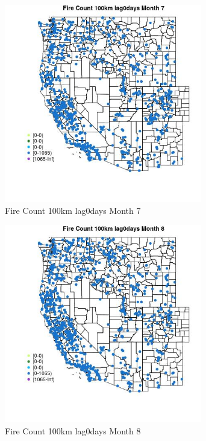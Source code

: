 \begin{figure} 
\centering  
\includegraphics[width=0.77\textwidth]{Code_Outputs/Report_ML_input_PM25_Step4_part_f_de_duplicated_aves_prioritize_24hr_obswNAs_MapObsMo7Fire_Count_100km_lag0days.jpg} 
\caption{\label{fig:Report_ML_input_PM25_Step4_part_f_de_duplicated_aves_prioritize_24hr_obswNAsMapObsMo7Fire_Count_100km_lag0days}Fire Count 100km lag0days Month 7} 
\end{figure} 
 

\begin{figure} 
\centering  
\includegraphics[width=0.77\textwidth]{Code_Outputs/Report_ML_input_PM25_Step4_part_f_de_duplicated_aves_prioritize_24hr_obswNAs_MapObsMo8Fire_Count_100km_lag0days.jpg} 
\caption{\label{fig:Report_ML_input_PM25_Step4_part_f_de_duplicated_aves_prioritize_24hr_obswNAsMapObsMo8Fire_Count_100km_lag0days}Fire Count 100km lag0days Month 8} 
\end{figure} 
 

